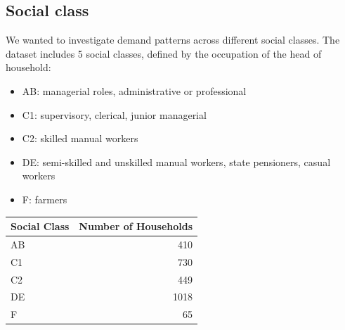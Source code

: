 \documentclass[
]{article}
\newenvironment{Shaded}{\begin{snugshade}}{\end{snugshade}}
\newcommand{\AttributeTok}[1]{\textcolor[rgb]{0.13,0.29,0.53}{#1}}
\newcommand{\CommentTok}[1]{\textcolor[rgb]{0.56,0.35,0.01}{\textit{#1}}}
\newcommand{\FunctionTok}[1]{\textcolor[rgb]{0.13,0.29,0.53}{\textbf{#1}}}
\newcommand{\NormalTok}[1]{#1}
\newcommand{\OtherTok}[1]{\textcolor[rgb]{0.56,0.35,0.01}{#1}}
\newcommand{\SpecialCharTok}[1]{\textcolor[rgb]{0.81,0.36,0.00}{\textbf{#1}}}
\newcommand{\StringTok}[1]{\textcolor[rgb]{0.31,0.60,0.02}{#1}}
\providecommand{\tightlist}{%
  \setlength{\itemsep}{0pt}\setlength{\parskip}{0pt}}
\begin{document}
\hypertarget{social-class}{%
\subsection{Social class}\label{social-class}}

We wanted to investigate demand patterns across different social
classes. The dataset includes 5 social classes, defined by the
occupation of the head of household:

\begin{itemize}
\tightlist
\item
  AB: managerial roles, administrative or professional
\item
  C1: supervisory, clerical, junior managerial
\item
  C2: skilled manual workers
\item
  DE: semi-skilled and unskilled manual workers, state pensioners,
  casual workers
\item
  F: farmers
\end{itemize}

\begin{Shaded}
\end{Shaded}

\begin{longtable}[]{@{}lr@{}}
\toprule\noalign{}
Social Class & Number of Households \\
\midrule\noalign{}
\endhead
\bottomrule\noalign{}
\endlastfoot
AB & 410 \\
C1 & 730 \\
C2 & 449 \\
DE & 1018 \\
F & 65 \\
\end{longtable}
\end{document}

